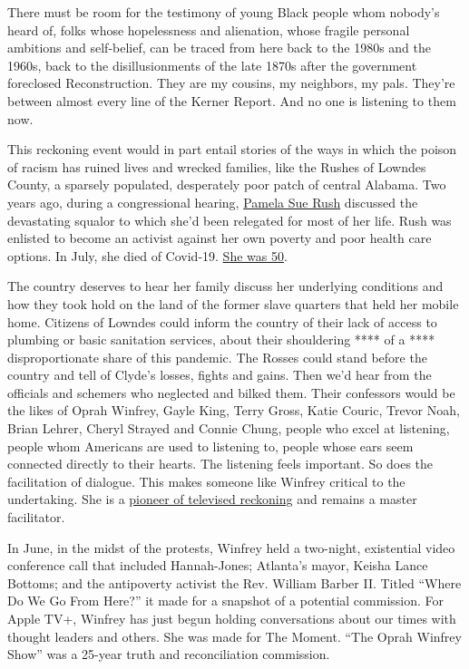 There must be room for the testimony of young Black people whom nobody's
heard of, folks whose hopelessness and alienation, whose fragile
personal ambitions and self-belief, can be traced from here back to the
1980s and the 1960s, back to the disillusionments of the late 1870s
after the government foreclosed Reconstruction. They are my cousins, my
neighbors, my pals. They're between almost every line of the Kerner
Report. And no one is listening to them now.

This reckoning event would in part entail stories of the ways in which
the poison of racism has ruined lives and wrecked families, like the
Rushes of Lowndes County, a sparsely populated, desperately poor patch
of central Alabama. Two years ago, during a congressional hearing,
\href{https://www.facingsouth.org/2020/07/remembering-pamela-sue-rush-death-caused-structural-poverty}{Pamela
Sue Rush} discussed the devastating squalor to which she'd been
relegated for most of her life. Rush was enlisted to become an activist
against her own poverty and poor health care options. In July, she died
of Covid-19.
\href{https://www.pbs.org/newshour/show/in-alabama-racial-disparities-in-health-outcomes-predate-the-pandemic}{She
was 50}.

The country deserves to hear her family discuss her underlying
conditions and how they took hold on the land of the former slave
quarters that held her mobile home. Citizens of Lowndes could inform the
country of their lack of access to plumbing or basic sanitation
services, about their shouldering **** of a **** disproportionate share
of this pandemic. The Rosses could stand before the country and tell of
Clyde's losses, fights and gains. Then we'd hear from the officials and
schemers who neglected and bilked them. Their confessors would be the
likes of Oprah Winfrey, Gayle King, Terry Gross, Katie Couric, Trevor
Noah, Brian Lehrer, Cheryl Strayed and Connie Chung, people who excel at
listening, people whom Americans are used to listening to, people whose
ears seem connected directly to their hearts. The listening feels
important. So does the facilitation of dialogue. This makes someone like
Winfrey critical to the undertaking. She is a
\href{https://www.nytimes.com/2018/06/21/arts/design/oprah-winfrey-smithsonian-national-museum-of-african-american-history-and-culture.html}{pioneer
of televised reckoning} and remains a master facilitator.

In June, in the midst of the protests, Winfrey held a two-night,
existential video conference call that included Hannah-Jones; Atlanta's
mayor, Keisha Lance Bottoms; and the antipoverty activist the Rev.
William Barber II. Titled ``Where Do We Go From Here?'' it made for a
snapshot of a potential commission. For Apple TV+, Winfrey has just
begun holding conversations about our times with thought leaders and
others. She was made for The Moment. ``The Oprah Winfrey Show'' was a
25-year truth and reconciliation commission.

